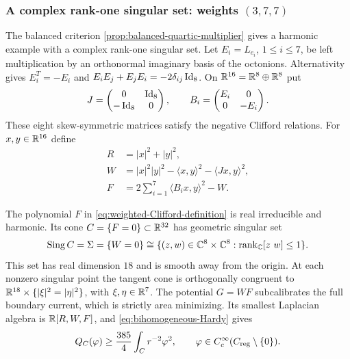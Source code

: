 \subsubsection{A complex rank-one singular set: weights \texorpdfstring{$(3,7,7)$}{(3,7,7)}}
\label{sec:weighted-Clifford-quartic}

The balanced criterion \cref{prop:balanced-quartic-multiplier} gives
a harmonic example with a complex rank-one singular set.
Let $E_i=L_{e_i}$, $1\leq i\leq7$, be left multiplication by an
orthonormal imaginary basis of the octonions.  Alternativity gives
$E_i^T=-E_i$ and $E_iE_j+E_jE_i=-2\delta_{ij}\operatorname{Id}_8$.
On $\mathbb R^{16}=\mathbb R^8\oplus\mathbb R^8$ put
\begin{equation}\label{eq:weighted-Clifford-matrices}
 J=\begin{pmatrix}0&\operatorname{Id}_8\\-\operatorname{Id}_8&0\end{pmatrix},\qquad
 B_i=\begin{pmatrix}E_i&0\\0&-E_i\end{pmatrix}.
\end{equation}
These eight skew-symmetric matrices satisfy the negative Clifford
relations.  For $x,y\in\mathbb R^{16}$ define
\begin{align}
 R&=|x|^2+|y|^2,\nonumber\\
 W&=|x|^2|y|^2-\langle x,y\rangle^2-\langle Jx,y\rangle^2,
 \label{eq:weighted-Clifford-definition}\\
 F&=2\sum_{i=1}^7\langle B_ix,y\rangle^2-W.\nonumber
\end{align}

\begin{proposition}
\label{thm:weighted-Clifford-quartic}
The polynomial $F$ in \eqref{eq:weighted-Clifford-definition} is
real irreducible and harmonic. Its cone $C=\{F=0\}\subset\mathbb R^{32}$ has
geometric singular set
\begin{equation}\label{eq:weighted-Clifford-singular-set}
 \operatorname{Sing} C=\Sigma=\{W=0\}
 \cong\{(z,w)\in\mathbb C^8\times\mathbb C^8:
             \operatorname{rank}_{\mathbb C}[z\ w]\leq1\}.
\end{equation}
This set has real dimension $18$ and is smooth away from the origin.
At each nonzero singular point the tangent cone is orthogonally
congruent to $\mathbb R^{18}\times\{|\xi|^2=|\eta|^2\}$, with
$\xi,\eta\in\mathbb R^7$. The potential $G=WF$ subcalibrates the full
boundary current, which is strictly area minimizing. Its smallest
Laplacian algebra is $\mathbb R[R,W,F]$, and \eqref{eq:bihomogeneous-Hardy} gives
\begin{equation}\label{cor:weighted-Clifford-Hardy}
 Q_C(\varphi)\geq\frac{385}{4}\int_C r^{-2}\varphi^2,
 \qquad \varphi\in C_c^\infty(C_{\mathrm{reg}}\setminus\{0\}).
\end{equation}
\end{proposition}

